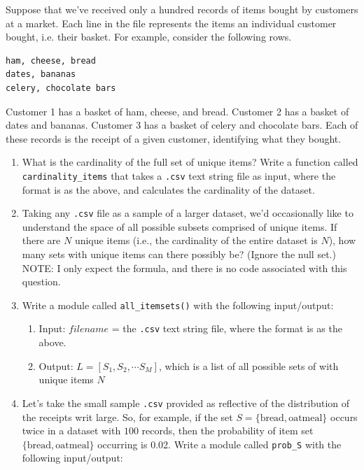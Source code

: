 \documentclass[paper=a4, fontsize=11pt]{scrartcl} %
\begin{document}
Suppose that we've received only a hundred records of items bought by customers at a market. Each line in the file represents the items an individual customer bought, i.e. their basket. For example, consider the following rows.

\begin{lstlisting}
ham, cheese, bread
dates, bananas
celery, chocolate bars
\end{lstlisting}

Customer 1 has a basket of ham, cheese, and bread. Customer 2 has a basket of dates and bananas. Customer 3 has a basket of celery and chocolate bars. Each of these records is the receipt of a given customer, identifying what they bought.

\begin{enumerate}
    \item What is the cardinality of the full set of unique items? Write a function called \verb"cardinality_items" that takes a \verb".csv" text string file as input, where the format is as the above, and calculates the cardinality of the dataset.
    \item Taking any \verb".csv" file as a sample of a larger dataset, we'd occasionally like to understand the space of all possible subsets comprised of unique items. If there are $N$ unique items (i.e., the cardinality of the entire dataset is $N$), how many sets with unique items can there possibly be? (Ignore the null set.) NOTE: I only expect the formula, and there is no code associated with this question.
    \item Write a module called \verb"all_itemsets()" with the following input/output:
      \begin{enumerate}
      \item Input: $filename$ = the \verb".csv" text string file, where the format is as the above.
      \item Output: $L = [ S_1, S_2, \cdots S_M ]$, which is a list of all possible sets of with unique items $N$
      \end{enumerate}
    \item Let's take the small sample \verb".csv" provided as reflective of the distribution of the receipts writ large. So, for example, if the set $S= \{ \text{bread}, \text{oatmeal}\}$ occurs twice in a dataset with $100$ records, then the probability of item set $\{ \text{bread}, \text{oatmeal} \}$ occurring is 0.02. Write a module called \verb"prob_S" with the following input/output:
      \begin{enumerate}

\end{enumerate}
\end{enumerate}
\end{document}
